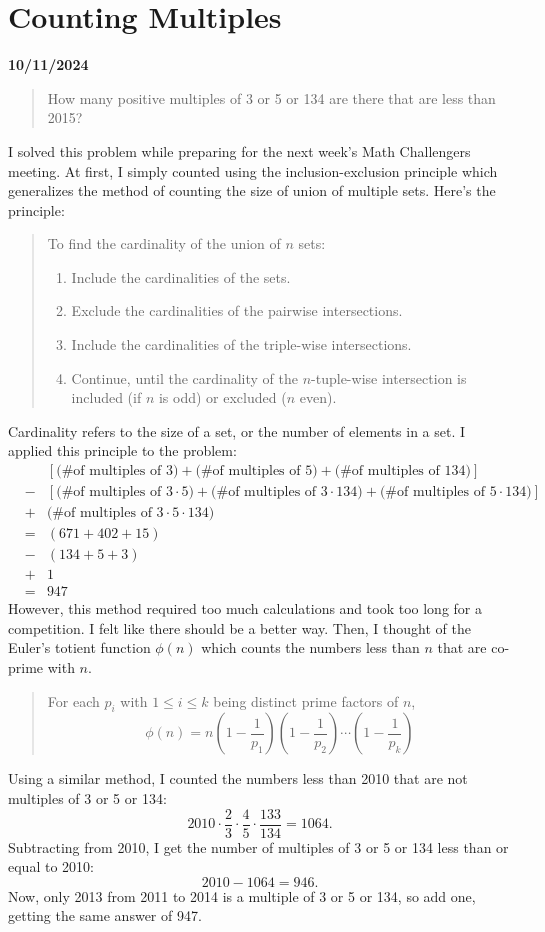 \documentclass[12pt, oneside]{article}
\begin{document}
\section*{Counting Multiples}
\textbf{10/11/2024}\\
\begin{quote}
How many positive multiples of 3 or 5 or 134 are there that are less than 2015?
\end{quote}
I solved this problem while preparing for the next week's Math Challengers meeting. At first, I simply counted using the inclusion-exclusion principle which generalizes the method of counting the size of union of multiple sets. Here's the principle:
\begin{quote}
To find the cardinality of the union of $n$ sets:
\begin{enumerate}
\item Include the cardinalities of the sets.
\item Exclude the cardinalities of the pairwise intersections.
\item Include the cardinalities of the triple-wise intersections.
\item Continue, until the cardinality of the $n$-tuple-wise intersection is included (if $n$ is odd) or excluded ($n$ even).
\end{enumerate}
\end{quote}
Cardinality refers to the size of a set, or the number of elements in a set. I applied this principle to the problem:
\begin{eqnarray*}
&&[\text{(\# of multiples of 3)} + \text{(\# of multiples of 5)} + \text{(\# of multiples of 134)}]\\
& - &[\text{(\# of multiples of $3\cdot5$)} + \text{(\# of multiples of $3\cdot134$)} + \text{(\# of multiples of $5\cdot134$)}]\\
& + &\text{(\# of multiples of $3\cdot5\cdot134$)}\\
& = &(671 + 402 + 15)\\
& - &(134 + 5 + 3)\\
& + &1\\
& = &947
\end{eqnarray*}
However, this method required too much calculations and took too long for a competition. I felt like there should be a better way. Then, I thought of the Euler's totient function $\phi(n)$ which counts the numbers less than $n$ that are co-prime with $n$. 
\begin{quote}
For each $p_i$ with $1 \leq i \leq k$ being distinct prime factors of $n$,
\[\phi(n) = n\left(1-\frac{1}{p_1}\right)\left(1-\frac{1}{p_2}\right)\cdots\left(1-\frac{1}{p_k}\right)\]
\end{quote}
Using a similar method, I counted the numbers less than 2010 that are not multiples of 3 or 5 or 134:
\[2010 \cdot \frac{2}{3} \cdot \frac{4}{5} \cdot \frac{133}{134} = 1064.\]
Subtracting from 2010, I get the number of multiples of 3 or 5 or 134 less than or equal to 2010:
\[2010 - 1064 = 946.\]
Now, only 2013 from 2011 to 2014 is a multiple of 3 or 5 or 134, so add one, getting the same answer of 947.
\end{document}
